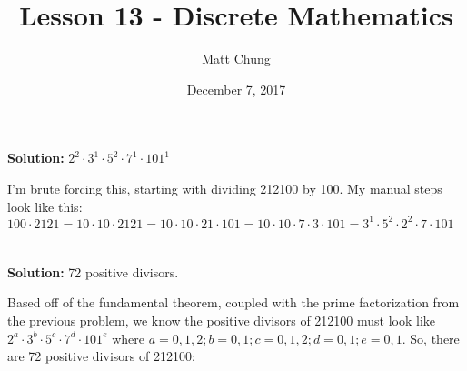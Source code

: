 \documentclass{article}
\title{Lesson 13 - Discrete Mathematics}
\author{Matt Chung}
\date{December 7, 2017}
\begin{document}
\maketitle

\section{}

\textbf{Solution:} $ 2^{2} \cdot 3^{1} \cdot 5^{2} \cdot 7^{1} \cdot 101^{1}$

I'm brute forcing this, starting with dividing 212100 by 100.  My manual steps look like this: $100 \cdot 2121 = 10 \cdot 10 \cdot 2121 = 10 \cdot 10 \cdot 21 \cdot 101 = 10 \cdot 10 \cdot 7 \cdot 3 \cdot 101 = 3^{1} \cdot 5^{2} \cdot 2^{2} \cdot 7 \cdot 101$

\section{}
\textbf{Solution: } 72 positive divisors.

Based off of the fundamental theorem, coupled with the prime factorization from the previous problem, we know the positive divisors of 212100 must look like $2^{a} \cdot 3^{b} \cdot 5^{c} \cdot 7^{d} \cdot 101^{e}$ where $a=0,1,2; b=0,1; c=0,1,2; d=0,1; e=0,1$. So, there are 72 positive divisors of 212100:\\
\end{document}
